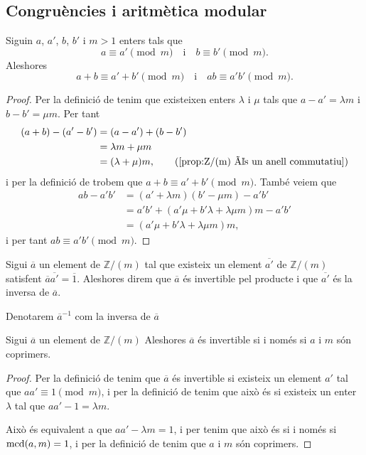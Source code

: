 \documentclass[../Apunts.tex]{subfiles}
\begin{document}
	\subsection{Congruències i aritmètica modular}
	\begin{proposition}
		Siguin \(a\), \(a'\), \(b\), \(b'\) i \(m>1\) enters tals que
		\[a\equiv a'\pmod{m}\quad\text{i}\quad b\equiv b'\pmod{m}.\]
		Aleshores
		\[a+b\equiv a'+b'\pmod{m}\quad\text{i}\quad ab\equiv a'b'\pmod{m}.\]
		\begin{proof}
			Per la definició de  tenim que existeixen enters \(\lambda\) i \(\mu\) tals que \(a-a'=\lambda m\) i \(b-b'=\mu m\). Per tant
			\begin{align*}
			(a+b)-(a'-b')&=(a-a')+(b-b')\\
			&=\lambda m+\mu m\\
			&=(\lambda+\mu)m,\tag{\ref{prop:Z/(m) és un anell commutatiu}}
			\end{align*}
			i per la definició de  trobem que \(a+b\equiv a'+b'\pmod{m}\). També veiem que
			\begin{align*}
			ab-a'b'&=(a'+\lambda m)(b'-\mu m)-a'b'\\
			&=a'b'+(a'\mu+b'\lambda+\lambda\mu m)m-a'b'\\
			&=(a'\mu+b'\lambda+\lambda\mu m)m,
			\end{align*}
			i per tant \(ab\equiv a'b'\pmod{m}\).
		\end{proof}
	\end{proposition}
	\begin{definition}
		\label{def:nombre modular invertible}
		Sigui \(\overline{a}\) un element de \(\mathbb{Z}/(m)\) tal que existeix un element \(\overline{a'}\) de \(\mathbb{Z}/(m)\) satisfent \(\overline{a}\overline{a'}=\overline{1}\). Aleshores direm que \(\overline{a}\) és invertible pel producte i que \(\overline{a'}\) és la inversa de \(\overline{a}\).
		
		Denotarem \(\overline{a}^{-1}\) com la inversa de \(\overline{a}\)
	\end{definition}
	\begin{proposition}
		\label{prop:condició equivalent a invertible en Z/(m)}
		Sigui \(\overline{a}\) un element de \(\mathbb{Z}/(m)\) Aleshores \(\overline{a}\) és invertible si i només si \(a\) i \(m\) són coprimers.
		\begin{proof}
			Per la definició de  tenim que \(\overline{a}\) és invertible si existeix un element \(a'\) tal que \(aa'\equiv1\pmod{m}\), i per la definició de  tenim que això és si existeix un enter \(\lambda\) tal que \(aa'-1=\lambda m\).
			
			Això és equivalent a que \(aa'-\lambda m=1\), i per  tenim que això és si i només si \(\operatorname{mcd}(a,m)=1\), i per la definició de  tenim que \(a\) i \(m\) són coprimers.
		\end{proof}
	\end{proposition}
\end{document}
